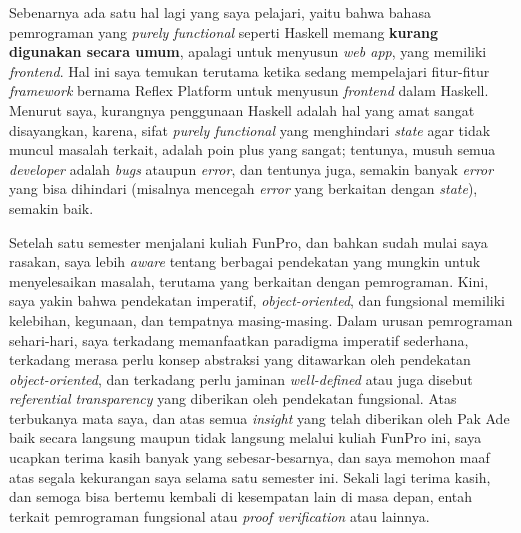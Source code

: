\documentclass{article}
\begin{document}
Sebenarnya ada satu hal lagi yang saya pelajari, yaitu bahwa bahasa pemrograman yang \textit{purely functional} seperti Haskell memang \textbf{kurang digunakan secara umum}, apalagi untuk menyusun \textit{web app}, yang memiliki \textit{frontend}. Hal ini saya temukan terutama ketika sedang mempelajari fitur-fitur \textit{framework} bernama Reflex Platform untuk menyusun \textit{frontend} dalam Haskell. Menurut saya, kurangnya penggunaan Haskell adalah hal yang amat sangat disayangkan, karena, sifat \textit{purely functional} yang menghindari \textit{state} agar tidak muncul masalah terkait, adalah poin plus yang sangat; tentunya, musuh semua \textit{developer} adalah \textit{bugs} ataupun \textit{error}, dan tentunya juga, semakin banyak \textit{error} yang bisa dihindari (misalnya mencegah \textit{error} yang berkaitan dengan \textit{state}), semakin baik.

Setelah satu semester menjalani kuliah FunPro, dan bahkan sudah mulai saya rasakan, saya lebih \textit{aware} tentang berbagai pendekatan yang mungkin untuk menyelesaikan masalah, terutama yang berkaitan dengan pemrograman. Kini, saya yakin bahwa pendekatan imperatif, \textit{object-oriented}, dan fungsional memiliki kelebihan, kegunaan, dan tempatnya masing-masing. Dalam urusan pemrograman sehari-hari, saya terkadang memanfaatkan paradigma imperatif sederhana, terkadang merasa perlu konsep abstraksi yang ditawarkan oleh pendekatan \textit{object-oriented}, dan terkadang perlu jaminan \textit{well-defined} atau juga disebut \textit{referential transparency} yang diberikan oleh pendekatan fungsional. Atas terbukanya mata saya, dan atas semua \textit{insight} yang telah diberikan oleh Pak Ade baik secara langsung maupun tidak langsung melalui kuliah FunPro ini, saya ucapkan terima kasih banyak yang sebesar-besarnya, dan saya memohon maaf atas segala kekurangan saya selama satu semester ini. Sekali lagi terima kasih, dan semoga bisa bertemu kembali di kesempatan lain di masa depan, entah terkait pemrograman fungsional atau \textit{proof verification} atau lainnya.
\end{document}
